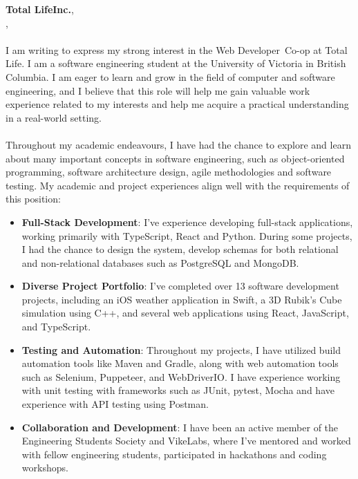\documentclass[a4paper, 12pt, oneside]{letter}
\newcommand{\Position}{Web Developer}
\newcommand{\CompanyName}{Total Life}
\newcommand{\CompanyNameSuffix}{Inc.}
\newcommand{\Division}{Marketing Team}
\newcommand{\LocationCity}{Edmonton}
\newcommand{\LocationState}{Alberta}
\begin{document}
\textbf{\CompanyName}\textbf{\CompanyNameSuffix},
\text{\Division}\\
\vspace{20pt}\text{\LocationCity}, \text{\LocationState} \\
\vspace{10pt} \\
 I am writing to express my strong interest in the \Position\ Co-op at \CompanyName. I am a software engineering student at the University of Victoria in British Columbia. I am eager to learn and grow in the field of computer and software engineering, and I believe that this role will help me gain valuable work experience related to my interests and help me acquire a practical understanding in a real-world setting. \vspace{-7pt}\\\\
Throughout my academic endeavours, I have had the chance to explore and learn about many important concepts in software engineering, such as object-oriented programming, software architecture design, agile methodologies and software testing. My academic and project experiences align well with the requirements of this position: 
\begin{itemize}
	\item \textbf{Full-Stack Development}: I've experience developing full-stack applications, working primarily with TypeScript, React and Python. During some projects, I had the chance to design the system, develop schemas for both relational and non-relational databases such as {PostgreSQL} and {MongoDB}.

	\item \textbf{Diverse Project Portfolio}: I've completed over 13 software development projects, including an iOS weather application in Swift, a 3D Rubik's Cube simulation using C++, and several web applications using React, JavaScript, and TypeScript.

	\item \textbf{Testing and Automation}: Throughout my projects, I have utilized build automation tools like Maven and Gradle, along with web automation tools such as Selenium, Puppeteer, and WebDriverIO. I have experience working with unit testing with frameworks such as JUnit, pytest, Mocha and have experience with API testing using Postman.

	\item \textbf{Collaboration and Development}: I have been an active member of the Engineering Students Society and VikeLabs, where I've mentored and worked with fellow engineering students, participated in hackathons and coding workshops.
\end{itemize}
\end{document}
